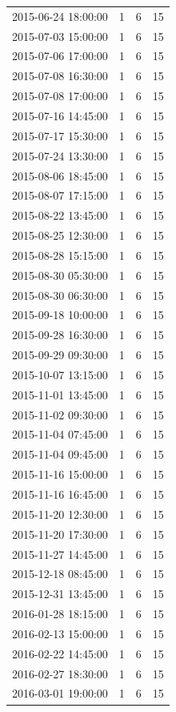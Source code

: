 \begin{tabular}{lrrr}
2015-06-24 18:00:00 & 1 & 6 & 15 \\
2015-07-03 15:00:00 & 1 & 6 & 15 \\
2015-07-06 17:00:00 & 1 & 6 & 15 \\
2015-07-08 16:30:00 & 1 & 6 & 15 \\
2015-07-08 17:00:00 & 1 & 6 & 15 \\
2015-07-16 14:45:00 & 1 & 6 & 15 \\
2015-07-17 15:30:00 & 1 & 6 & 15 \\
2015-07-24 13:30:00 & 1 & 6 & 15 \\
2015-08-06 18:45:00 & 1 & 6 & 15 \\
2015-08-07 17:15:00 & 1 & 6 & 15 \\
2015-08-22 13:45:00 & 1 & 6 & 15 \\
2015-08-25 12:30:00 & 1 & 6 & 15 \\
2015-08-28 15:15:00 & 1 & 6 & 15 \\
2015-08-30 05:30:00 & 1 & 6 & 15 \\
2015-08-30 06:30:00 & 1 & 6 & 15 \\
2015-09-18 10:00:00 & 1 & 6 & 15 \\
2015-09-28 16:30:00 & 1 & 6 & 15 \\
2015-09-29 09:30:00 & 1 & 6 & 15 \\
2015-10-07 13:15:00 & 1 & 6 & 15 \\
2015-11-01 13:45:00 & 1 & 6 & 15 \\
2015-11-02 09:30:00 & 1 & 6 & 15 \\
2015-11-04 07:45:00 & 1 & 6 & 15 \\
2015-11-04 09:45:00 & 1 & 6 & 15 \\
2015-11-16 15:00:00 & 1 & 6 & 15 \\
2015-11-16 16:45:00 & 1 & 6 & 15 \\
2015-11-20 12:30:00 & 1 & 6 & 15 \\
2015-11-20 17:30:00 & 1 & 6 & 15 \\
2015-11-27 14:45:00 & 1 & 6 & 15 \\
2015-12-18 08:45:00 & 1 & 6 & 15 \\
2015-12-31 13:45:00 & 1 & 6 & 15 \\
2016-01-28 18:15:00 & 1 & 6 & 15 \\
2016-02-13 15:00:00 & 1 & 6 & 15 \\
2016-02-22 14:45:00 & 1 & 6 & 15 \\
2016-02-27 18:30:00 & 1 & 6 & 15 \\
2016-03-01 19:00:00 & 1 & 6 & 15 \\

\end{tabular}
